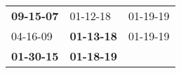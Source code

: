 \begin{supertabular}{p{0.33\columnwidth}p{0.33\columnwidth}p{0.33\columnwidth}}
 \textbf{09-15-07\textsuperscript{}} &           01-12-18\textsuperscript{} &  01-19-19\textsuperscript{} \\
          04-16-09\textsuperscript{} &  \textbf{01-13-18\textsuperscript{}} &  01-19-19\textsuperscript{} \\
 \textbf{01-30-15\textsuperscript{}} &  \textbf{01-18-19\textsuperscript{}} &                             \\
\end{supertabular}
